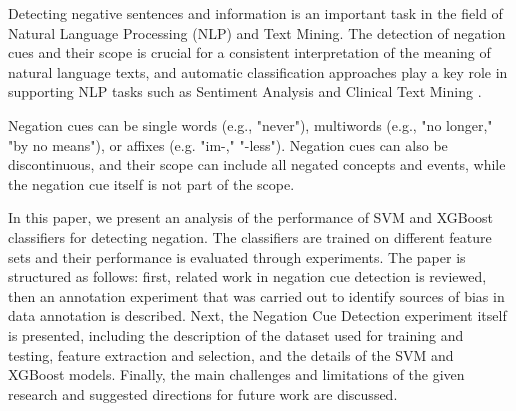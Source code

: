 
Detecting negative sentences and information is an important task in the field of Natural Language Processing (NLP) and Text Mining. The detection of negation cues and their scope is crucial for a consistent interpretation of the meaning of natural language texts, and automatic classification approaches play a key role in supporting NLP tasks such as Sentiment Analysis \cite{cruz2016machine} and Clinical Text Mining \cite{mehrabi2015deepen}.

Negation cues can be single words (e.g., "never"), multiwords (e.g., "no longer," "by no means"), or affixes (e.g. "im-," "-less"). Negation cues can also be discontinuous, and their scope can include all negated concepts and events, while the negation cue itself is not part of the scope.


In this paper, we present an analysis of the performance of SVM and XGBoost classifiers for detecting negation. The classifiers are trained on different feature sets and their performance is evaluated through experiments. The paper is structured as follows: first, related work in negation cue detection is reviewed, then an annotation experiment that was carried out to identify sources of bias in data annotation is described. Next, the Negation Cue Detection experiment itself is presented, including the description of the dataset used for training and testing, feature extraction and selection, and the details of the SVM and XGBoost models. Finally, the main challenges and limitations of the given research and suggested directions for future work are discussed.

